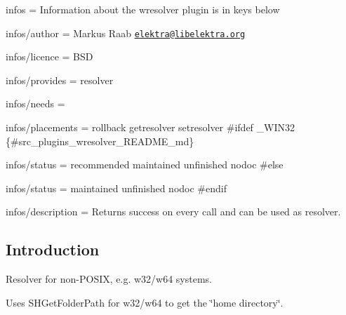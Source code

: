 
\begin{DoxyItemize}
\item infos = Information about the wresolver plugin is in keys below
\item infos/author = Markus Raab \href{mailto:elektra@libelektra.org}{\tt elektra@libelektra.\+org}
\item infos/licence = B\+S\+D
\item infos/provides = resolver
\item infos/needs =
\item infos/placements = rollback getresolver setresolver \#ifdef \+\_\+\+W\+I\+N32 \{\#src\+\_\+plugins\+\_\+wresolver\+\_\+\+R\+E\+A\+D\+M\+E\+\_\+md\}
\item infos/status = recommended maintained unfinished nodoc \#else
\item infos/status = maintained unfinished nodoc \#endif
\item infos/description = Returns success on every call and can be used as resolver.
\end{DoxyItemize}

\subsection*{Introduction}

Resolver for non-\/\+P\+O\+S\+I\+X, e.\+g. w32/w64 systems.

Uses S\+H\+Get\+Folder\+Path for w32/w64 to get the \char`\"{}home directory\char`\"{}. 